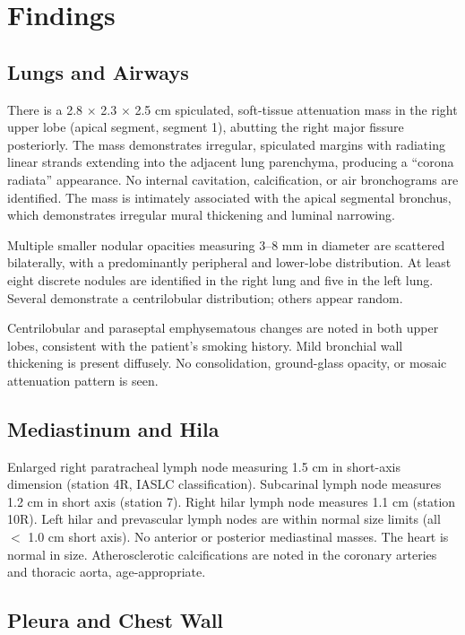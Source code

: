 \section{Findings}

\subsection{Lungs and Airways}

There is a 2.8 $\times$ 2.3 $\times$ 2.5 cm spiculated, soft-tissue attenuation mass in the right upper lobe (apical segment, segment 1), abutting the right major fissure posteriorly. The mass demonstrates irregular, spiculated margins with radiating linear strands extending into the adjacent lung parenchyma, producing a ``corona radiata'' appearance. No internal cavitation, calcification, or air bronchograms are identified. The mass is intimately associated with the apical segmental bronchus, which demonstrates irregular mural thickening and luminal narrowing.

Multiple smaller nodular opacities measuring 3--8 mm in diameter are scattered bilaterally, with a predominantly peripheral and lower-lobe distribution. At least eight discrete nodules are identified in the right lung and five in the left lung. Several demonstrate a centrilobular distribution; others appear random.

Centrilobular and paraseptal emphysematous changes are noted in both upper lobes, consistent with the patient's smoking history. Mild bronchial wall thickening is present diffusely. No consolidation, ground-glass opacity, or mosaic attenuation pattern is seen.

\subsection{Mediastinum and Hila}

Enlarged right paratracheal lymph node measuring 1.5 cm in short-axis dimension (station 4R, IASLC classification). Subcarinal lymph node measures 1.2 cm in short axis (station 7). Right hilar lymph node measures 1.1 cm (station 10R). Left hilar and prevascular lymph nodes are within normal size limits (all $<$ 1.0 cm short axis). No anterior or posterior mediastinal masses. The heart is normal in size. Atherosclerotic calcifications are noted in the coronary arteries and thoracic aorta, age-appropriate.

\subsection{Pleura and Chest Wall}

